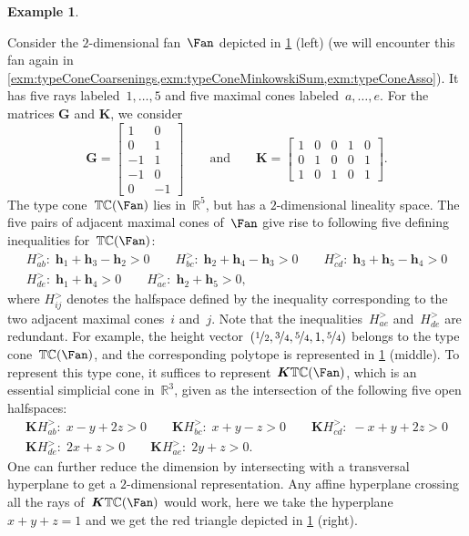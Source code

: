 \documentclass{amsart}
\theoremstyle{definition}
\newtheorem{example}[theorem]{Example}
\newcommand{\R}{\mathbb{R}} %
\renewcommand{\b}[1]{{\boldsymbol{#1}}} %
\newcommand{\transpose}[1]{{#1}^T} %
\newcommand{\typeCone}{\mathbb{TC}} %
\begin{document}
\begin{example}
\begin{figure}[b]
	\label{fig:typeCone}
\end{figure}
%
Consider the $2$-dimensional fan~$\Fan$ depicted in \cref{fig:typeCone} (left) (we will encounter this fan again in \cref{exm:typeConeCoarsenings,exm:typeConeMinkowskiSum,exm:typeConeAsso}).
It has five rays labeled~$1, \dots, 5$ and five maximal cones labeled~$a,\dots, e$.
For the matrices $\b{G}$ and $\b{K}$, we consider
\[
\b{G} = \begin{bmatrix} 1 & 0 \\ 0 & 1 \\ -1 & 1 \\ -1 & 0 \\ 0 & -1 \end{bmatrix}
\qquad\text{and}\qquad
\b{K} = \begin{bmatrix} 1 & 0 & 0 & 1 & 0 \\ 0 & 1 & 0 & 0 & 1 \\ 1 & 0 & 1 & 0 & 1 \end{bmatrix}.
\]
The type cone~$\typeCone(\Fan)$ lies in~$\R^5$, but has a $2$-dimensional lineality space.
The five pairs of adjacent maximal cones of~$\Fan$ give rise to following five defining inequalities for~$\typeCone(\Fan)$:
\begin{gather*}
H^>_{ab}: \; \b{h}_1 + \b{h}_3 - \b{h}_2 > 0
\qquad
H^>_{bc}: \; \b{h}_2 + \b{h}_4 - \b{h}_3 > 0
\qquad
H^>_{cd}: \; \b{h}_3 + \b{h}_5 - \b{h}_4 > 0
\\
H^>_{de}: \; \b{h}_1 + \b{h}_4 > 0
\qquad
H^>_{ae}: \; \b{h}_2 + \b{h}_5 > 0,
\end{gather*}
where $H^>_{ij}$ denotes the halfspace defined by the inequality corresponding to the two adjacent maximal cones~$i$ and~$j$.
Note that the inequalities~$H^>_{ae}$ and~$H^>_{de}$ are redundant.
For example, the height vector~$(\nicefrac{1}{2}, \nicefrac{3}{4}, \nicefrac{5}{4}, 1, \nicefrac{5}{4})$ belongs to the type cone~$\typeCone(\Fan)$, and the corresponding polytope is represented in \cref{fig:typeCone} (middle).
To represent this type cone, it suffices to represent~$\b{K}\typeCone(\Fan)$, which is an essential simplicial cone in~$\R^3$, given as the intersection of the following five open halfspaces:
\begin{gather*}
\b{K}H^>_{ab}: \; {x} - {y} +2 {z} > 0
\qquad
\b{K}H^>_{bc}: \; {x} + {y} - {z} > 0
\qquad
\b{K}H^>_{cd}: \; -{x} + {y} +2 {z} > 0
\\
\b{K}H^>_{de}: \; 2{x} + {z} > 0
\qquad
\b{K}H^>_{ae}: \; 2{y} + {z} > 0.
\end{gather*}
One can further reduce the dimension by intersecting with a transversal hyperplane to get a $2$-dimensional representation. Any affine hyperplane crossing all the rays of~$\b{K}\typeCone(\Fan)$ would work, here we take the hyperplane $x+y+z=1$ and we get the red triangle depicted in \cref{fig:typeCone} (right).
\end{example}
\end{document}
